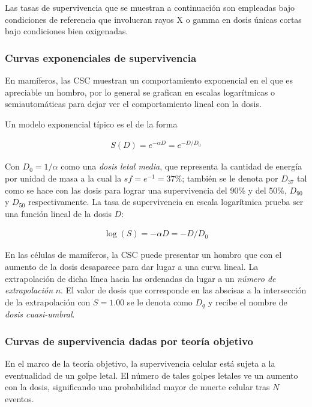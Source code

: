 \documentclass[12pt,letterpaper, oneside]{book}
\begin{document}
			Las tasas de supervivencia que se muestran a continuación son empleadas bajo condiciones de referencia que involucran rayos X o gamma en dosis únicas cortas bajo condiciones bien oxigenadas. 
			
			\subsubsection{Curvas exponenciales de supervivencia}
			En mamíferos, las CSC muestran un comportamiento exponencial en el que es apreciable un hombro, por lo general se grafican en escalas logarítmicas o semiautomáticas para dejar ver el comportamiento lineal con la dosis\cite{Mayles.2007, Tubiana.1990}. 
			
			Un modelo exponencial típico es el de la forma
			
			\begin{eqnarray}
			S(D)=e^{-\alpha D}=e^{-D/D_0} \label{exponencial_csc_dosis_lineal}
			\end{eqnarray}
			
			Con $D_0=1/\alpha$ como una \textit{dosis letal media}, que representa la cantidad de energía por unidad de masa a la cual la $sf=e^{-1}=37\%$; también se le denota por $D_{37}$\cite{Tubiana.1990} tal como se hace con las dosis para lograr una supervivencia del 90\% y del 50\%, $D_{90}$ y $D_{50}$ respectivamente\cite{Mayles.2007}. La tasa de supervivencia en escala logarítmica prueba ser una función lineal de la dosis $D$:
			
			\begin{eqnarray}
				\log(S) = -\alpha D=-D/D_0 \label{logaritmica_csc_dosis_lineal}
			\end{eqnarray}
			
			En las células de mamíferos, la CSC puede presentar un hombro que con el aumento de la dosis desaparece para dar lugar a una curva lineal. La extrapolación de dicha línea hacia las ordenadas da lugar a un \textit{número de extrapolación} $n$\cite{Tubiana.1990}. El valor de dosis que corresponde en las abscisas a la intersección de la extrapolación con $S=1.00$ se le denota como $D_q$ y recibe el nombre de \textit{dosis cuasi-umbral}\cite{Tubiana.1990}.  
			
			\subsubsection{Curvas de supervivencia dadas por teoría objetivo}
			En el marco de la teoría objetivo, la supervivencia celular está sujeta a la eventualidad de un golpe letal. El número de tales golpes letales ve un aumento con la dosis, significando una probabilidad mayor de muerte celular tras $N$ eventos\cite{Tubiana.1990, Hall.2000}.
			
\end{document}
